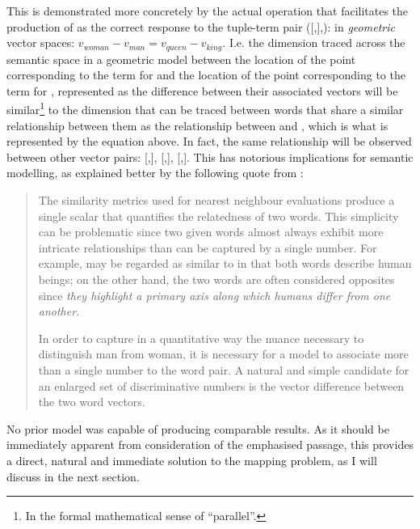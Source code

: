 This is demonstrated more concretely by the actual operation that facilitates the production of  as the correct response to the tuple-term pair  ([,],): in \emph{geometric} vector spaces: $v_{woman} - v_{man} = v_{queen} - v_{king}$.
I.e. the dimension traced across the semantic space in a geometric model between the location of the point corresponding to the term for  and the location of the point corresponding to the term for , represented as the difference between their associated vectors will be similar\footnote{
    In the formal mathematical sense of ``parallel''.
} to the dimension that can be traced between words that share a similar relationship between them as the relationship between  and , which is what is represented by the equation above.
In fact, the same relationship will be observed between other vector pairs: [,], [,], [,].
This has notorious implications for semantic modelling, as explained better by the following quote from \citet{pennington2014}:
\begin{quote}
    The similarity metrics used for nearest neighbour evaluations produce a single scalar that quantifies the relatedness of two words. This simplicity can be problematic since two given words almost always exhibit more intricate relationships than can be captured by a single number. For example,  may be regarded as similar to  in that both words describe human beings; on the other hand, the two words are often considered opposites since \emph{they highlight a primary axis along which humans differ from one another}.

    In order to capture in a quantitative way the nuance necessary to distinguish man from woman, it is necessary for a model to associate more than a single number to the word pair. A natural and simple candidate for an enlarged set of discriminative numbers is the vector difference between the two word vectors.
\end{quote}
No prior model was capable of producing comparable results.
As it should be immediately apparent from consideration of the emphasised passage, this provides a direct, natural and immediate solution to the mapping problem, as I will discuss in the next section.

